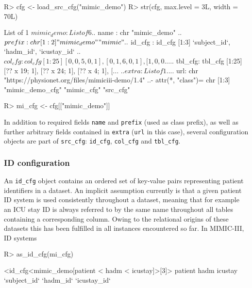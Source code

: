 \documentclass[
  notitle,
  nojss,
  noheadings]{jss}
\begin{document}
\begin{CodeChunk}
\begin{CodeInput}
R> cfg <- load_src_cfg("mimic_demo")
R> str(cfg, max.level = 3L, width = 70L)
\end{CodeInput}
\begin{CodeOutput}
List of 1
 $ mimic_demo:List of 6
  ..$ name   : chr "mimic_demo"
  ..$ prefix : chr [1:2] "mimic_demo" "mimic"
  ..$ id_cfg : id_cfg [1:3] `subject_id`, `hadm_id`, `icustay_id`
  ..$ col_cfg: col_cfg [1:25] [0, 0, 5, 0, 1], [0, 1, 6, 0, 1], [1, 0, 0...
  ..$ tbl_cfg: tbl_cfg [1:25] [?? x 19; 1], [?? x 24; 1], [?? x 4; 1], [...
  ..$ extra  :List of 1
  .. ..$ url: chr "https://physionet.org/files/mimiciii-demo/1.4"
  ..- attr(*, "class")= chr [1:3] "mimic_demo_cfg" "mimic_cfg" "src_cfg"
\end{CodeOutput}
\begin{CodeInput}
R> mi_cfg <- cfg[["mimic_demo"]]
\end{CodeInput}
\end{CodeChunk}

In addition to required fields \texttt{name} and \texttt{prefix} (used
as class prefix), as well as further arbitrary fields contained in
\texttt{extra} (\texttt{url} in this case), several configuration
objects are part of \texttt{src\_cfg}: \texttt{id\_cfg},
\texttt{col\_cfg} and \texttt{tbl\_cfg}.

\hypertarget{id-configuration}{%
\subsubsection{ID configuration}\label{id-configuration}}

An \texttt{id\_cfg} object contains an ordered set of key-value pairs
representing patient identifiers in a dataset. An implicit assumption
currently is that a given patient ID system is used consistently
throughout a dataset, meaning that for example an ICU stay ID is always
referred to by the same name throughout all tables containing a
corresponding column. Owing to the relational origins of these datasets
this has been fulfilled in all instances encountered so far. In
MIMIC-III, ID systems

\begin{CodeChunk}
\begin{CodeInput}
R> as_id_cfg(mi_cfg)
\end{CodeInput}
\begin{CodeOutput}
<id_cfg<mimic_demo[patient < hadm < icustay]>[3]>
     patient         hadm      icustay 
`subject_id`    `hadm_id` `icustay_id` 
\end{CodeOutput}
\end{CodeChunk}
\end{document}
